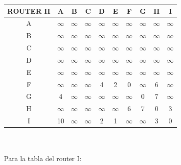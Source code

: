 \documentclass{article}
\begin{document}
\begin{tabular}{ | c | c | c | c | c | c | c | c | c | c |}
\hline                 
ROUTER H    & A      & B      & C      & D      & E      & F      & G      & H      & I      \\
\hline
        A   &$\infty$&$\infty$&$\infty$&$\infty$&$\infty$&$\infty$&$\infty$&$\infty$&$\infty$\\
\hline
        B   &$\infty$&$\infty$&$\infty$&$\infty$&$\infty$&$\infty$&$\infty$&$\infty$&$\infty$\\
\hline
        C   &$\infty$&$\infty$&$\infty$&$\infty$&$\infty$&$\infty$&$\infty$&$\infty$&$\infty$\\
\hline
        D   &$\infty$&$\infty$&$\infty$&$\infty$&$\infty$&$\infty$&$\infty$&$\infty$&$\infty$\\
\hline
        E   &$\infty$&$\infty$&$\infty$&$\infty$&$\infty$&$\infty$&$\infty$&$\infty$&$\infty$\\
\hline
        F   &$\infty$&$\infty$&$\infty$& 4      & 2      & 0      &$\infty$& 6      &$\infty$\\
\hline
        G   & 4      &$\infty$&$\infty$&$\infty$&$\infty$&$\infty$& 0      & 7      &$\infty$\\
\hline
        H   &$\infty$&$\infty$&$\infty$&$\infty$&$\infty$& 6      & 7      & 0      & 3      \\
\hline 
        I   & 10     &$\infty$&$\infty$& 2      & 1      &$\infty$&$\infty$& 3      & 0      \\
\hline
\end{tabular}
\\\\
Para la tabla del router I:\\
\end{document}
